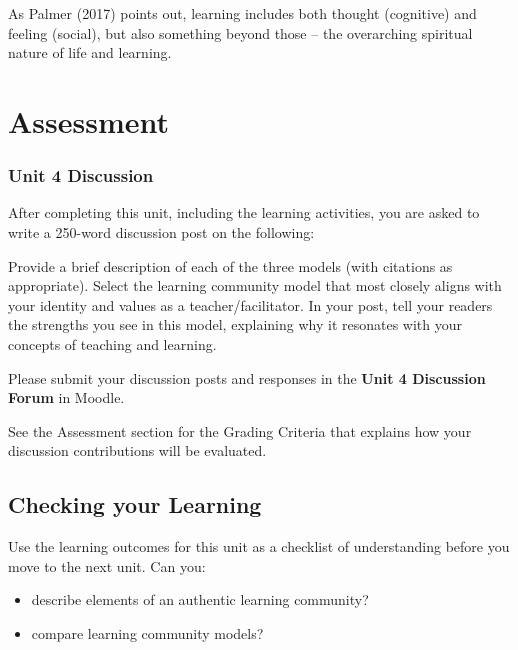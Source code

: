 \documentclass[
]{book}
\providecommand{\tightlist}{%
  \setlength{\itemsep}{0pt}\setlength{\parskip}{0pt}}
\begin{document}
As Palmer (2017) points out, learning includes both thought (cognitive) and feeling (social), but also something beyond those -- the overarching spiritual nature of life and learning.

\hypertarget{assessment-3}{%
\section*{Assessment}\label{assessment-3}}

\begin{assessment}
\hypertarget{unit-4-discussion}{%
\subsubsection{Unit 4 Discussion}\label{unit-4-discussion}}

After completing this unit, including the learning activities, you are
asked to write a 250-word discussion post on the following:

Provide a brief description of each of the three models (with citations
as appropriate). Select the learning community model that most closely
aligns with your identity and values as a teacher/facilitator. In your
post, tell your readers the strengths you see in this model, explaining
why it resonates with your concepts of teaching and learning.

Please submit your discussion posts and responses in the \textbf{Unit 4
Discussion Forum} in Moodle.

See the Assessment section for the Grading Criteria that explains how
your discussion contributions will be evaluated.
\end{assessment}

\hypertarget{checking-your-learning-3}{%
\subsection*{Checking your Learning}\label{checking-your-learning-3}}

\begin{progress}
Use the learning outcomes for this unit as a checklist of understanding
before you move to the next unit. Can you:

\begin{itemize}
\tightlist
\item
  describe elements of an authentic learning community?
\item
  compare learning community models?
\end{itemize}
\end{progress}
\end{document}
